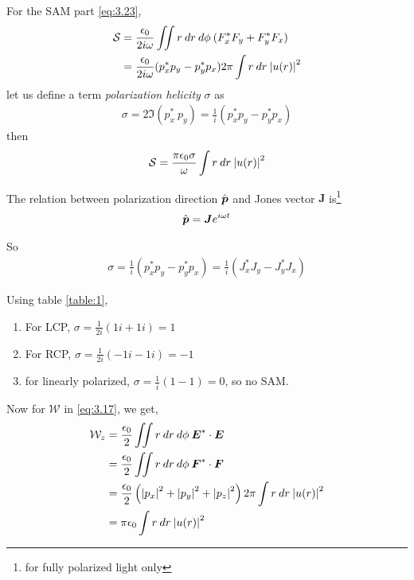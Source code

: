\documentclass[11pt,a4paper]{article}
\numberwithin{equation}{section}
\begin{document}
For the SAM part \ref{eq:3.23},
\begin{align}
	\mathcal{S} &= \frac{\epsilon_0}{2i\omega}\iint r\:dr\:d\phi\: (F_x^\ast F_y + F_y^\ast F_x)\nonumber\\
	&=\frac{\epsilon_0}{2i\omega} (p_x^\ast p_y- p_y^\ast p_x)2\pi \int r\:dr\: \abs{u(r)}^2
\end{align}
let us define a term \textit{polarization helicity} $\sigma$ as 
\begin{align}
	\sigma = 2\Im(p_x^\ast\: p_y) = \frac{1}{i} (p_x^\ast p_y- p_y^\ast p_x)
\end{align}
then
\begin{align}
	\mathcal{S}
	=\frac{\pi\epsilon_0\sigma }{\omega}\int r\:dr\: \abs{u(r)}^2 \label{eq:3.28}
\end{align}

The relation between polarization direction $\Hat{\boldsymbol{p}}$ and Jones vector $\boldsymbol{J}$ is\footnote{for fully polarized light only} 
	\begin{align}
		\Hat{\boldsymbol{p}} = \boldsymbol{J} e^{i\omega t}
	\end{align}

So
\begin{align}
	\sigma = \frac{1}{i}(p_x^\ast p_y- p_y^\ast p_x)
	=\frac{1}{i}(J_x^\ast J_y- J_y^\ast J_x)
\end{align}

Using table \ref{table:1},
\begin{enumerate}
	\item For LCP, $\sigma = \frac{1}{2i}(1i+1i)=1$
	\item For RCP, $\sigma = \frac{1}{2i}(-1i-1i)=-1$
	\item for linearly polarized, $\sigma = \frac{1}{i}(1-1)=0$, so no SAM.
\end{enumerate}

Now for $\mathcal{W}$ in \ref{eq:3.17}, we get,
\begin{align}
	\mathcal{W}_z &=\frac{\epsilon_0}{2}\iint r\:dr\:d\phi\: \boldsymbol{E}^\ast\cdot\boldsymbol{E}\nonumber\\
	&= \frac{\epsilon_0}{2}\iint r\:dr\:d\phi\: \boldsymbol{F}^\ast\cdot\boldsymbol{F}\nonumber\\
	&=\frac{\epsilon_0}{2} \left(\abs{p_x}^2+\abs{p_y}^2+\abs{p_z}^2\right) 2\pi\int r\:dr\:\abs{u(r)}^2\nonumber\\
	&=\pi\epsilon_0\int r\:dr\:\abs{u(r)}^2 \label{eq:3.31}
\end{align}
\end{document}
